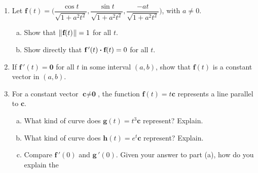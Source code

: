 \begin{enumerate}[\bfseries 1.]
\par\noindent For Exercises 5-6, find the velocity $\textbf{v}(t)$ and acceleration $\textbf{a}(t)$ of an object
with the given position vector $\textbf{r}(t)$.
[{[\bfseries 1.]}]
[{[\bfseries 1.]}]
 \item Let $\textbf{f}(t) = \biggl( \dfrac{\cos t}{\sqrt{1 + a^2 t^2}},\dfrac{\sin t}{\sqrt{1 + a^2 t^2}},
  \dfrac{-at}{\sqrt{1 + a^2 t^2}} \biggr)$, with $a \ne 0$.
  \begin{enumerate}[(a)]
   \item Show that $\lVert\mspace{1mu}\textbf{f}(t)\mspace{1mu}\rVert = 1$ for all $t$.
   \item Show directly that $\textbf{f}\,'(t) \bm{\cdot} \textbf{f}(t) = 0$ for all $t$.
  \end{enumerate}
 \item If $\textbf{f}\,'(t) = \textbf{0}$ for all $t$ in some interval $(a,b)$, show that $\textbf{f}(t)$ is
  a constant vector in $(a,b)$.
\newpage
 \item For a constant vector $\textbf{c} \ne \textbf{0}$, the function $\textbf{f}(t) = t\textbf{c}$ represents a line
  parallel to $\textbf{c}$.
  \begin{enumerate}[(a)]
   \item What kind of curve does $\textbf{g}(t) = t^3\textbf{c}$ represent? Explain.
   \item What kind of curve does $\textbf{h}(t) = e^t\textbf{c}$ represent? Explain.
   \item Compare $\textbf{f}\,'(0)$ and $\textbf{g}\,'(0)$. Given your answer to part (a), how do you explain the

\end{enumerate}
\end{enumerate}
